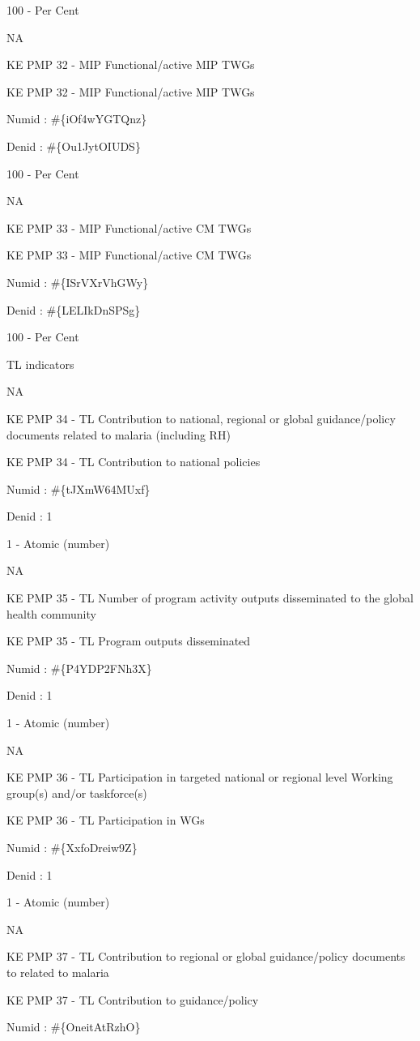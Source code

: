 \documentclass[]{book}
\begin{document}
100 - Per Cent

NA

KE PMP 32 - MIP Functional/active MIP TWGs

KE PMP 32 - MIP Functional/active MIP TWGs

Numid : \#\{iOf4wYGTQnz\}

Denid : \#\{Ou1JytOIUDS\}

100 - Per Cent

NA

KE PMP 33 - MIP Functional/active CM TWGs

KE PMP 33 - MIP Functional/active CM TWGs

Numid : \#\{ISrVXrVhGWy\}

Denid : \#\{LELIkDnSPSg\}

100 - Per Cent

TL indicators

NA

KE PMP 34 - TL Contribution to national, regional or global guidance/policy documents related to malaria (including RH)

KE PMP 34 - TL Contribution to national policies

Numid : \#\{tJXmW64MUxf\}

Denid : 1

1 - Atomic (number)

NA

KE PMP 35 - TL Number of program activity outputs disseminated to the global health community

KE PMP 35 - TL Program outputs disseminated

Numid : \#\{P4YDP2FNh3X\}

Denid : 1

1 - Atomic (number)

NA

KE PMP 36 - TL Participation in targeted national or regional level Working group(s) and/or taskforce(s)

KE PMP 36 - TL Participation in WGs

Numid : \#\{XxfoDreiw9Z\}

Denid : 1

1 - Atomic (number)

NA

KE PMP 37 - TL Contribution to regional or global guidance/policy documents to related to malaria

KE PMP 37 - TL Contribution to guidance/policy

Numid : \#\{OneitAtRzhO\}
\end{document}
